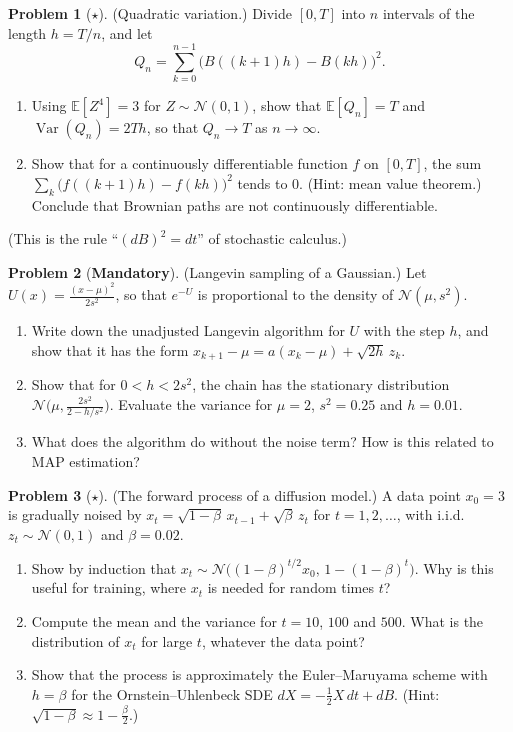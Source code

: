 \documentclass[11pt]{article}
\theoremstyle{definition}
\newtheorem{problem}{Problem}[section]
\newcommand{\mandatory}{\textcolor{red!70!black}{\textbf{Mandatory}}}
\newcommand{\E}{\mathbb{E}}
\DeclareMathOperator{\Var}{Var}
\begin{document}
\begin{problem}[$\star$]\label{pr:quadratic-variation}
    (Quadratic variation.) Divide $[0, T]$ into $n$ intervals of the length $h = T/n$, and let
    \[Q_n = \sum_{k=0}^{n-1}\big(B((k + 1)h) - B(kh)\big)^2.\]
    \begin{enumerate}[label=(\alph*)]
        \item Using $\E[Z^4] = 3$ for $Z \sim \mathcal{N}(0, 1)$, show that $\E[Q_n] = T$ and $\Var(Q_n) = 2Th$, so that $Q_n \to T$ as $n \to \infty$.
        \item Show that for a continuously differentiable function $f$ on $[0, T]$, the sum $\sum_k \big(f((k + 1)h) - f(kh)\big)^2$ tends to $0$. (Hint: mean value theorem.) Conclude that Brownian paths are not continuously differentiable.
    \end{enumerate}
    (This is the rule ``$(dB)^2 = dt$'' of stochastic calculus.)
\end{problem}

\begin{problem}[\mandatory]\label{pr:ula}
    (Langevin sampling of a Gaussian.) Let $U(x) = \frac{(x - \mu)^2}{2s^2}$, so that $e^{-U}$ is proportional to the density of $\mathcal{N}(\mu, s^2)$.
    \begin{enumerate}[label=(\alph*)]
        \item Write down the unadjusted Langevin algorithm for $U$ with the step $h$, and show that it has the form $x_{k+1} - \mu = a(x_k - \mu) + \sqrt{2h}\,z_k$.
        \item Show that for $0 < h < 2s^2$, the chain has the stationary distribution $\mathcal{N}\big(\mu, \frac{2s^2}{2 - h/s^2}\big)$. Evaluate the variance for $\mu = 2$, $s^2 = 0.25$ and $h = 0.01$.
        \item What does the algorithm do without the noise term? How is this related to MAP estimation?
    \end{enumerate}
\end{problem}

\begin{problem}[$\star$]\label{pr:diffusion-forward}
    (The forward process of a diffusion model.) A data point $x_0 = 3$ is gradually noised by $x_t = \sqrt{1 - \beta}\,x_{t-1} + \sqrt{\beta}\,z_t$ for $t = 1, 2, \ldots$, with i.i.d.\ $z_t \sim \mathcal{N}(0, 1)$ and $\beta = 0.02$.
    \begin{enumerate}[label=(\alph*)]
        \item Show by induction that $x_t \sim \mathcal{N}\big((1 - \beta)^{t/2}x_0, \, 1 - (1 - \beta)^t\big)$. Why is this useful for training, where $x_t$ is needed for random times $t$?
        \item Compute the mean and the variance for $t = 10$, $100$ and $500$. What is the distribution of $x_t$ for large $t$, whatever the data point?
        \item Show that the process is approximately the Euler--Maruyama scheme with $h = \beta$ for the Ornstein--Uhlenbeck SDE $dX = -\frac{1}{2}X\,dt + dB$. (Hint: $\sqrt{1 - \beta} \approx 1 - \frac{\beta}{2}$.)
    \end{enumerate}
\end{problem}
\end{document}
